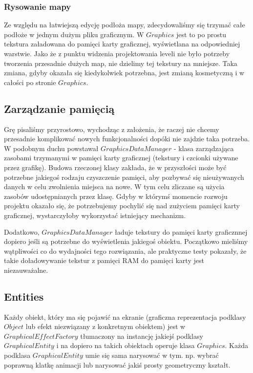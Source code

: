 \documentclass[licencjacka]{pracamgr}
\begin{document}
      \subsubsection{Rysowanie mapy}
	Ze względu na łatwiejszą edycję podłoża mapy, zdecydowaliśmy się trzymać całe podłoże w jednym dużym pliku
	graficznym. W $Graphics$ jest to po prostu tekstura załadowana do pamięci karty graficznej, wyświetlana na 
	odpowiedniej warstwie. Jako że z punktu widzenia projektowania leveli nie było potrzeby tworzenia przesadnie
	dużych map, nie dzielimy tej tekstury na mniejsze. Taka zmiana, gdyby okazała się kiedykolwiek potrzebna,
	jest zmianą kosmetyczną i w całości po stronie $Graphics$.
      
    \subsection{Zarządzanie pamięcią}
      Grę pisaliśmy przyrostowo, wychodząc z założenia, że raczej nie chcemy przesadnie komplikować nowych
      funkcjonalności dopóki nie zajdzie taka potrzeba. W podobnym duchu powstawał $GraphicsDataManager$ - klasa
      zarządzająca zasobami trzymanymi w pamięci karty graficznej (tekstury i czcionki używane przez grafikę). Budowa
      rzeczonej klasy zakłada, że w przyszłości może być potrzebne jakiegoś rodzaju czyszczenie pamięci, aby pozbywać
      się nieużywanych danych w celu zwolnienia miejsca na nowe. W tym celu zliczane są użycia zasobów udostępnianych
      przez klasę. Gdyby w którymś momencie rozwoju projektu okazało się, że potrzebujemy pochylić się nad zużyciem
      pamięci karty graficznej, wystarczyłoby wykorzystać istniejący mechanizm.
      
      Dodatkowo, $GraphicsDataManager$ ładuje tekstury do pamięci karty graficznnej dopiero jeśli są potrzebne do
      wyświetlenia jakiegoś obiektu. Początkowo mieliśmy wątpliwości co do wydajności tego rozwiązania, ale praktyczne
      testy pokazały, że takie doładowywanie tekstur z pamięci RAM do pamięci karty jest niezauważalne.
      
    \subsection{Entities}
      Każdy obiekt, który ma się pojawić na ekranie (graficzna reprezentacja podklasy $Object$ lub efekt niezwiązany
      z konkretnym obiektem) jest w $GraphicalEffectFactory$ tłumaczony na instancję jakiejś podklasy $GraphicalEntity$
      i na dopiero na takich obiektach operuje klasa $Graphics$. Każda podklasa $GraphicalEntity$ umie się sama
      narysować w tym. np. wybrać poprawną klatkę animacji lub narysować jakiś prosty geometryczny kształt.
      
\end{document}
